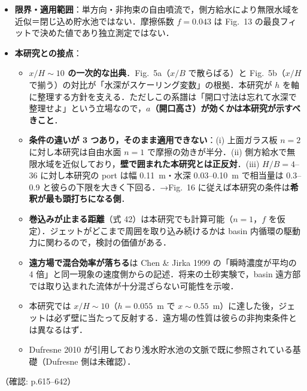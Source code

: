 \documentclass[11pt]{jsarticle}
\begin{document}
\begin{itemize}
\begin{itemize}
  \end{itemize}
  \item \textbf{限界・適用範囲}：単方向・非拘束の自由噴流で，側方給水により無限水域を近似＝閉じ込め貯水池ではない．摩擦係数 $f = 0.043$ は Fig.~13 の最良フィットで決めた値であり独立測定ではない．
  \item \textbf{本研究との接点}：
  \begin{itemize}
    \item \textbf{$x/H \sim 10$ の一次的な出典}．Fig.~5a（$x/B$ で散らばる）と Fig.~5b（$x/H$ で揃う）の対比が「水深がスケーリング変数」の根拠．本研究が $h$ を軸に整理する方針を支える．ただしこの系譜は「開口寸法は忘れて水深で整理せよ」という立場なので，\textbf{$a$（開口高さ）が効くかは本研究が示すべきこと}．
    \item \textbf{条件の違いが 3 つあり，そのまま適用できない}：(i) 上面ガラス板 $n = 2$ に対し本研究は自由水面 $n = 1$ で摩擦の効きが半分．(ii) 側方給水で無限水域を近似しており，\textbf{壁で囲まれた本研究とは正反対}．(iii) $H/B = 4$--$36$ に対し本研究の port は幅 0.11~m・水深 0.03--0.10~m で相当量は 0.3--0.9 と彼らの下限を大きく下回る．→Fig.~16 に従えば本研究の条件は\textbf{希釈が最も頭打ちになる側}．
    \item \textbf{巻込みが止まる距離}（式 42）は本研究でも計算可能（$n = 1$，$f$ を仮定）．ジェットがどこまで周囲を取り込み続けるかは basin 内循環の駆動力に関わるので，検討の価値がある．
    \item \textbf{遠方場で混合効率が落ちる}は Chen \& Jirka 1999 の「瞬時濃度が平均の 4 倍」と同一現象の速度側からの記述．将来の土砂実験で，basin 遠方部では取り込まれた流体が十分混ざらない可能性を示唆．
    \item 本研究では $x/H \sim 10$（$h = 0.055$~m で $x \sim 0.55$~m）に達した後，ジェットは必ず壁に当たって反射する．遠方場の性質は彼らの非拘束条件とは異なるはず．
    \item Dufresne 2010 が引用しており浅水貯水池の文脈で既に参照されている基礎（Dufresne 側は未確認）．
  \end{itemize}
\end{itemize}
\noindent（確認: p.615--642）
\end{document}
